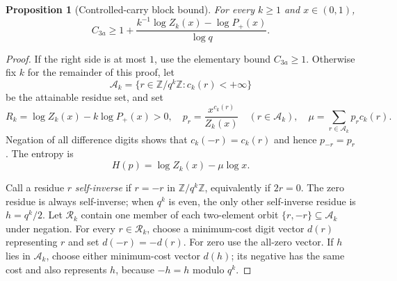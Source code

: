 \documentclass[11pt]{article}
\newtheorem{proposition}{Proposition}
\begin{document}
\begin{proposition}[Controlled-carry block bound]\label{prop:controlled-block}
For every $k\ge1$ and $x\in(0,1)$,
\begin{equation}\label{eq:controlled-block-bound}
 C_{3a}\ge1+
 \frac{k^{-1}\log Z_k(x)-\log P_+(x)}{\log q}.
\end{equation}
\end{proposition}

\begin{proof}
If the right side is at most $1$, use the elementary bound $C_{3a}\ge1$.
Otherwise fix $k$ for the remainder of this proof, let
\[
 \mathcal A_k=\{r\in\mathbb Z/q^k\mathbb Z:c_k(r)<+\infty\}
\]
be the attainable residue set, and set
\[
 R_k=\log Z_k(x)-k\log P_+(x)>0,
 \quad p_r=\frac{x^{c_k(r)}}{Z_k(x)}\quad(r\in\mathcal A_k),
 \quad \mu=\sum_{r\in\mathcal A_k}p_rc_k(r).
\]
Negation of all difference digits shows that $c_k(-r)=c_k(r)$ and hence
$p_{-r}=p_r$.  The entropy is
\begin{equation}\label{eq:controlled-entropy}
 H(p)=\log Z_k(x)-\mu\log x.
\end{equation}

Call a residue $r$ \emph{self-inverse} if $r=-r$ in
$\mathbb Z/q^k\mathbb Z$, equivalently if $2r=0$.  The zero residue is
always self-inverse; when $q^k$ is even, the only other self-inverse residue
is $h=q^k/2$.  Let $\mathcal R_k$ contain one member of each two-element
orbit $\{r,-r\}\subseteq\mathcal A_k$ under negation.  For every
$r\in\mathcal R_k$, choose a minimum-cost digit vector $d(r)$ representing
$r$ and set $d(-r)=-d(r)$.  For zero use the all-zero vector.  If $h$ lies
in $\mathcal A_k$, choose either minimum-cost vector $d(h)$; its negative
has the same cost and also represents $h$, because $-h=h$ modulo $q^k$.


\end{proof}
\end{document}
